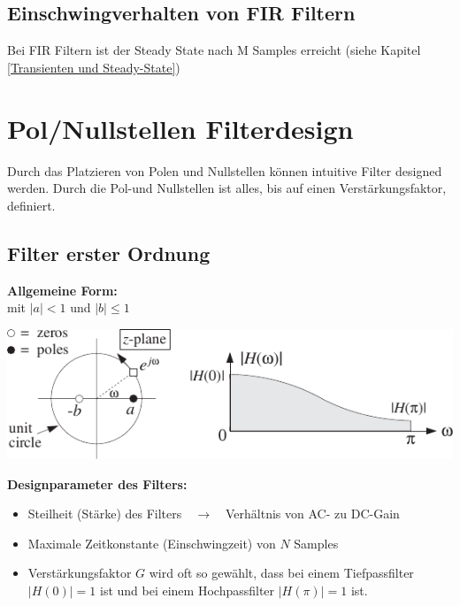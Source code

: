 	\subsection{Einschwingverhalten von FIR Filtern}
		Bei FIR Filtern ist der Steady State nach M Samples erreicht (siehe Kapitel \ref{Transienten und Steady-State})\\[-0.2cm]

\section{Pol/Nullstellen Filterdesign}
	Durch das Platzieren von Polen und Nullstellen können intuitive Filter designed werden. Durch die Pol-und Nullstellen ist alles, bis auf einen Verstärkungsfaktor, definiert.\\[-0.3cm]
	
	\subsection{Filter erster Ordnung}
		\vspace*{-0.6cm}\begin{minipage}{0.5\textwidth}
			\textbf{Allgemeine Form:}$\qquad$\\[0.2cm]
			mit $|a|<1$ und $|b|\leq1$
		\end{minipage}
		\begin{minipage}{0.5\textwidth}
			\includegraphics[width = 1\textwidth]{pic/firstOrderFilter.pdf}	
		\end{minipage}
		\textbf{Designparameter des Filters:}
		\begin{itemize}
			\item Steilheit (Stärke) des Filters$\quad\rightarrow\quad$Verhältnis von AC- zu DC-Gain\\[0.2cm]
			\item Maximale Zeitkonstante (Einschwingzeit) von $N$ Samples\\[0.2cm]
			\item Verstärkungsfaktor $G$ wird oft so gewählt, dass bei einem Tiefpassfilter $|H(0)|=1$ ist und bei einem Hochpassfilter $|H(\pi)|=1$ ist.
		\end{itemize}$ $\\[-1cm]

